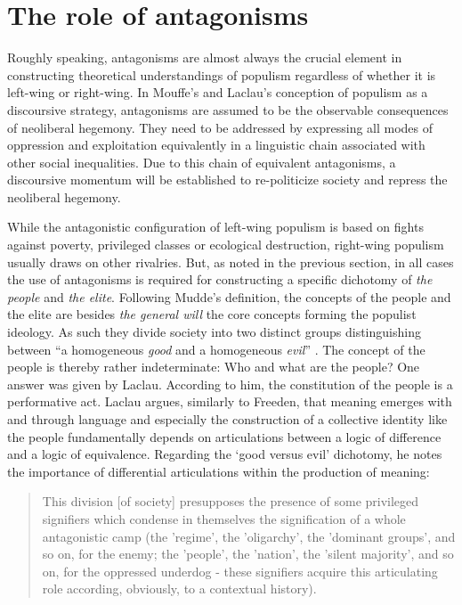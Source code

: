 \documentclass[a4paper]{scrreprt}
\begin{document}
\section{The role of antagonisms}
Roughly speaking, antagonisms are almost always the crucial element in constructing theoretical understandings of populism regardless of whether it is left-wing or right-wing. In Mouffe's and Laclau's conception of populism as a discoursive strategy, antagonisms are assumed to be the observable consequences of neoliberal hegemony. They need to be addressed by expressing all modes of oppression and exploitation equivalently in a linguistic chain associated with other social inequalities. Due to this chain of equivalent antagonisms, a discoursive momentum will be established to re-politicize society and repress the neoliberal hegemony. \cite[p.~135]{laclaumouffe:2001}\par
While the antagonistic configuration of left-wing populism is based on fights against poverty, privileged classes or ecological destruction, right-wing populism usually draws on other rivalries. But, as noted in the previous section, in all cases the use of antagonisms is required for constructing a specific dichotomy of {\em the people} and {\em the elite}. Following Mudde's definition, the concepts of the people and the elite are besides {\em the general will} the core concepts forming the populist ideology. As such they divide society into two distinct groups distinguishing between ``a homogeneous {\em good} and a homogeneous {\em evil}'' \cite[p.~7]{mudde:2017}. The concept of the people is thereby rather indeterminate: Who and what are the people? One answer was given by Laclau. According to him, the constitution of the people is a performative act. Laclau argues, similarly to Freeden, that meaning emerges with and through language and especially the construction of a collective identity like the people fundamentally depends on articulations between a logic of difference and a logic of equivalence. \cite[p.~x]{laclau:2005} Regarding the `good versus evil' dichotomy, he notes the importance of differential articulations within the production of meaning:
\begin{quote}
    This division [of society] presupposes the presence of some privileged signifiers which condense in themselves the signification of a whole antagonistic camp (the 'regime', the 'oligarchy', the 'dominant groups', and so on, for the enemy; the 'people', the 'nation', the 'silent majority', and so on, for the oppressed underdog - these signifiers acquire this articulating role according, obviously, to a contextual history). \cite[p.~87]{laclau:2005}
\end{quote}
\end{document}
